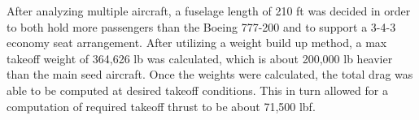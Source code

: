 After analyzing multiple aircraft, a fuselage length of 210 ft was decided in order to both hold more passengers than the Boeing 777-200 and to support a 3-4-3 economy seat arrangement. After utilizing a weight build up method, a max takeoff weight of 364,626 lb was calculated, which is about 200,000 lb heavier than the main seed aircraft. Once the weights were calculated, the total drag was able to be computed at desired takeoff conditions. This in turn allowed for a computation of required takeoff thrust to be about 71,500 lbf. 

\clearpage
